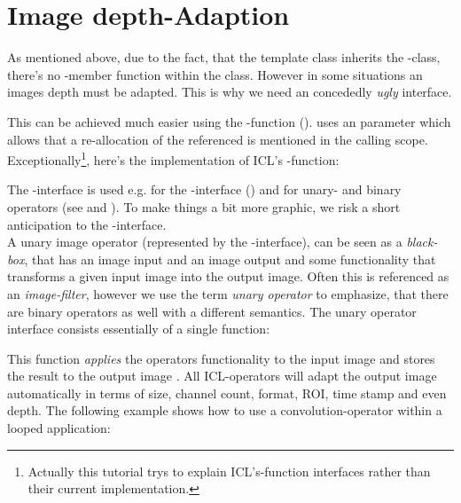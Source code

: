 \section {\label{sec:depth-adaption}Image depth-Adaption}

As mentioned above, due to the fact, that the  template class inherits the -class, there's no -member function within the  class. However in some situations an images depth must be adapted. This is why we need an concededly \emph{ugly}  interface.


This can be achieved much easier using the -function (). 
 uses an  parameter which allows that a re-allocation of the referenced  is mentioned in the calling scope. Exceptionally\footnote{Actually this tutorial trys to explain ICL's-function interfaces rather than their current implementation.}, here's the implementation of ICL's -function:


The -interface is used e.g. for the -interface () and for unary- and binary operators (see  and ). To make things a bit more graphic, we risk a short anticipation to the -interface.\\
A unary image operator (represented by the -interface), can be seen as a \emph{black-box}, that has an image input and an image output and some functionality that transforms a given input image into the output image. Often this is referenced as an \emph{image-filter}, however we use the term \emph{unary operator} to emphasize, that there are binary operators as well with a different semantics. The unary operator interface consists essentially of a single function:


This function \emph{applies} the operators functionality to the input image  and stores the result to the output image . All ICL-operators will adapt the output image automatically in terms of size, channel count, format, ROI, time stamp and even depth. The following example shows how to use a convolution-operator within a looped application:

